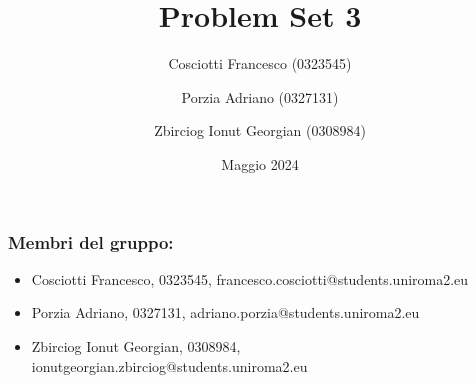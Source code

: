 \documentclass{article}
\title{Problem Set 3}
\author{Cosciotti Francesco (0323545) \and Porzia Adriano (0327131) \and Zbirciog Ionut Georgian (0308984)}
\date{Maggio 2024}
\begin{document}
\maketitle

\tableofcontents

\subsubsection*{Membri del gruppo:}

\begin{itemize}
    \item Cosciotti Francesco, 0323545, francesco.cosciotti@students.uniroma2.eu
    \item Porzia Adriano, 0327131, adriano.porzia@students.uniroma2.eu
    \item Zbirciog Ionut Georgian, 0308984, ionutgeorgian.zbirciog@students.uniroma2.eu
\end{itemize}


%


\end{document}
